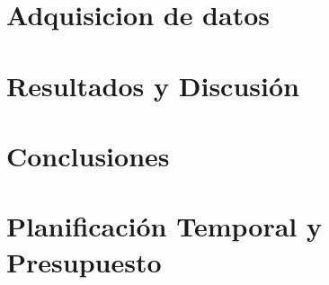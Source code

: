 \documentclass[a4paper,11pt,twoside]{report}
\begin{document}
\cleardoublepage
\chapter{Adquisicion de datos}


\cleardoublepage
\chapter{Resultados y Discusión}


\cleardoublepage
\chapter{Conclusiones}


\cleardoublepage
\chapter{Planificación Temporal y Presupuesto}


\cleardoublepage
{}
\printbibliography
\end{document}

